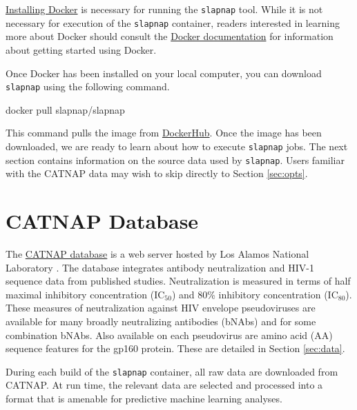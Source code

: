 \documentclass[]{article}
\newenvironment{Shaded}{\begin{snugshade}}{\end{snugshade}}
\newcommand{\ExtensionTok}[1]{#1}
\newcommand{\NormalTok}[1]{#1}
\begin{document}
\href{https://docs.docker.com/docker-for-windows/install/}{Installing Docker} is necessary for running the \texttt{slapnap} tool. While it is not necessary for execution of the \texttt{slapnap} container, readers interested in learning more about Docker should consult the \href{https://docs.docker.com/get-started/}{Docker documentation} for information about getting started using Docker.

Once Docker has been installed on your local computer, you can download \texttt{slapnap} using the following command.

\begin{Shaded}
\begin{Highlighting}[]
\ExtensionTok{docker}\NormalTok{ pull slapnap/slapnap}
\end{Highlighting}
\end{Shaded}

This command pulls the image from \href{https://hub.docker.com/}{DockerHub}. Once the image has been downloaded, we are ready to learn about how to execute \texttt{slapnap} jobs. The next section contains information on the source data used by \texttt{slapnap}. Users familiar with the CATNAP data may wish to skip directly to Section \ref{sec:opts}.

\hypertarget{sec:catnap}{%
\section{CATNAP Database}\label{sec:catnap}}

The \href{https://www.hiv.lanl.gov/components/sequence/HIV/neutralization/index.html}{CATNAP database} is a web server hosted by Los Alamos National Laboratory \citep{yoon2015catnap}. The database integrates antibody neutralization and HIV-1 sequence data from published studies. Neutralization is measured in terms of half maximal inhibitory concentration (IC\(_50\)) and 80\% inhibitory concentration (IC\(_80\)). These measures of neutralization against HIV envelope pseudoviruses are available for many broadly neutralizing antibodies (bNAbs) and for some combination bNAbs. Also available on each pseudovirus are amino acid (AA) sequence features for the gp160 protein. These are detailed in Section \ref{sec:data}.

During each build of the \texttt{slapnap} container, all raw data are downloaded from CATNAP. At run time, the relevant data are selected and processed into a format that is amenable for predictive machine learning analyses.
\end{document}
